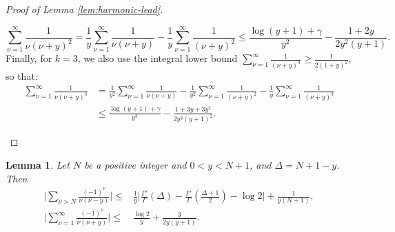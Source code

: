 \documentclass[11pt,letterpaper,oneside,reqno]{amsart}
\renewcommand{\^}[1]{\widehat{#1}}
\numberwithin{equation}{section}
\newtheorem{lemma}[theorem]{Lemma}
\theoremstyle{remark}
\begin{document}
\begin{proof}[Proof of Lemma \ref{lem:harmonic-lead}]
\begin{itemize}
\begin{equation}
\sum_{\nu=1}^\infty \frac{1}{\nu(\nu+y)^2} %
= \frac{1}{y} \sum_{\nu=1}^\infty \frac{1}{\nu(\nu+y)} - \frac{1}{y} \sum_{\nu=1}^\infty \frac{1}{(\nu+y)^2} 
\leq \frac{\log(y+1)+ \gamma}{y^2} - \frac{1+2y}{2y^2(y+1)}.\label{eq:square_residual_bound}
\end{equation}
%
Finally, for $k=3$, we also use the integral lower bound $\sum_{\nu=1}^\infty \frac{1}{(\nu+y)^{3}} \geq \frac{1}{2(1+y)^2}$, so that:
\begin{equation}
\begin{aligned}
\sum_{\nu=1}^\infty \frac{1}{\nu(\nu+y)^3} &= \frac{1}{y^2} \sum_{\nu=1}^\infty \frac{1}{\nu(\nu+y)} - \frac{1}{y^2} \sum_{\nu=1}^\infty \frac{1}{(\nu+y)^2} - \frac{1}{y} \sum_{\nu=1}^\infty \frac{1}{(\nu+y)^3} \\
&\leq 
\frac{\log(y+1)+\gamma}{y^3} - \frac{1+3y+3y^2}{2y^3(y+1)^2}.\label{eq:3_residual_bound}
\end{aligned}
\end{equation}
\end{itemize}
\end{proof}
\begin{lemma} \label{lemma_bnd_sum_nu_powers}
Let $N$ be a positive integer and $0<y<N+1$, and $\Delta=N+1-y$. Then
\begin{align}
        \bigg| \sum_{\nu>N}\frac{(-1)^{\nu}}{\nu(\nu-y)} \bigg| \leq &  \frac{1}{y}  \bigg| \frac{\Gamma'}{\Gamma}(\Delta) - \frac{\Gamma'}{\Gamma}\left(\frac{\Delta+1}{2}\right) - \log 2  \bigg|   +\frac{1}{y(N+1)}, \label{bound_sum_minus_nu_nu-y}
\\
        \bigg| \sum_{\nu=1}^\infty\frac{(-1)^{\nu}}{\nu(\nu+y)} \bigg| \leq & \frac{\log 2}{y} + \frac{3}{2y(y+1)} .
        \label{bound_sum_minus_nu_nu+y}
\end{align}
\end{lemma}
%
\end{document}
